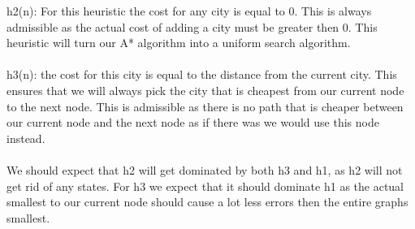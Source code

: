 \documentclass{article}
\newcommand\tab[1][1cm]{\hspace*{#1}}
\begin{document}
\begin{titlepage}
\tab h2(n): For this heuristic the cost for any city is equal to 0. This is always admissible as the actual cost of adding a city must be greater then 0. This heuristic will turn our A* algorithm into a uniform search algorithm. \\\\
\tab h3(n): the cost for this city is equal to the distance from the current city. This ensures that we will always pick the city that is cheapest from our current node to the next node. This is admissible as  there is no path that is cheaper between our current node and the next node as if there was we would use this node instead. \\\\
We should expect that h2 will get dominated by both h3 and h1, as h2 will not get rid of any states. For h3 we expect that it should dominate h1 as the actual smallest to our current node should cause a lot less errors then the entire graphs smallest.
\end{titlepage}
\end{document}

